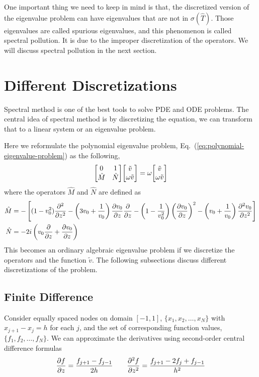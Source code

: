 One important thing we need to keep in mind is that, the discretized version of the eigenvalue problem can have eigenvalues that are not in $\sigma(\hat{T})$. Those eigenvalues are called spurious eigenvalues, and this phenomenon is called spectral pollution. It is due to the improper discretization of the operators. We will discuss spectral pollution in the next section.

\section{Different Discretizations}
Spectral method is one of the best tools to solve PDE and ODE problems. \cite{trefethen_spectral_2000} The central idea of spectral method is by discretizing the equation, we can transform that to a linear system or an eigenvalue problem.

Here we reformulate the polynomial eigenvalue problem, Eq.~(\ref{eq:polynomial-eigenvalue-problem}) as the following,
\begin{equation} \label{eq:eigenvalue-problem}
	\mqty[ 0 & 1\\ \hat{M} & \hat{N} ]\mqty[ \tilde{v}\\ \omega \tilde{v}] = \omega\mqty[ \tilde{v}\\ \omega \tilde{v}]
\end{equation}
where the operators $\hat{M}$ and $\hat{N}$ are defined as
\begin{align*}
	\hat{M} & = -\left[(1-v_0^2)\pdv[2]{}{z}
		-\left(3v_0 + \frac{1}{v_0}\right)\pdv{v_0}{z}\pdv{}{z}
		- \left(1-\frac{1}{v_0^2}\right)\left(\pdv{v_0}{z}\right)^2
	- \left(v_0+\frac{1}{v_0}\right)\pdv[2]{v_0}{z}\right]  \\
	\hat{N} & = -2i\left(v_0\pdv{}{z} +\pdv{v_0}{z} \right)
\end{align*}
This becomes an ordinary algebraic eigenvalue problem if we discretize the operators and the function $\tilde{v}$. The following subsections discuss different discretizations of the problem.

\subsection{Finite Difference}
Consider equally spaced nodes on domain $[-1,1]$, $\{x_1, x_2, \dots, x_N\}$ with $x_{j+1}-x_{j} = h$ for each $j$, and the set of corresponding function values, $\{ f_1, f_2, \dots, f_N \}$. We can approximate the derivatives using second-order central difference formulas
\[
	\pdv{f}{z} = \frac{f_{j+1} - f_{j-1}}{2h}
	\qquad
	\pdv[2]{f}{z} = \frac{f_{j+1} -2f_{j} +f_{j-1}}{h^2}
\]

